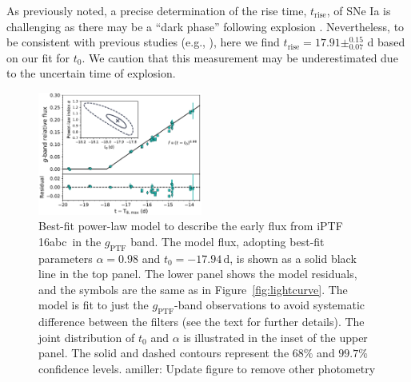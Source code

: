 \documentclass[twocolumn]{aastex61}
\newcommand{\abc}{iPTF\,16abc}
\newcommand{\amiller}[1]{{\color{blue} amiller: {#1}}}
\begin{document}
As previously noted, a precise determination of the rise time, $t_\mathrm{rise}$, of SNe Ia is challenging as there may be a ``dark phase'' following explosion \citep{2014ApJ...784...85P}. Nevertheless, to be consistent with previous studies (e.g., \citealt{2011MNRAS.416.2607G}), here we find $t_\mathrm{rise} = 17.91\pm _{0.07}^{0.15}$ d based on our fit for $t_0$. We caution that this measurement may be underestimated due to the uncertain time of explosion. 

\begin{figure}[!htb]
  \centering
  \includegraphics[width=0.48\textwidth]{early_lc.pdf}
  \caption{Best-fit power-law model to describe the early flux from 
  \abc\ in the $g_\mathrm{PTF}$ band. The model flux, adopting 
  best-fit parameters $\alpha=0.98$ and $t_0=-17.94\,\textrm{d}$, 
  is shown as a solid black line in the top panel. The lower panel 
  shows the model residuals, and the symbols are the same as in
  Figure~\ref{fig:lightcurve}. The model is fit to just the 
  $g_\mathrm{PTF}$-band observations to avoid systematic difference 
  between the filters (see the text for further 
  details). The joint distribution of $t_0$ and $\alpha$ is 
  illustrated in the inset of the upper panel. The solid and 
  dashed contours represent the $68\%$ and $99.7\%$ confidence 
  levels. \amiller{Update figure to remove other photometry}
  }
  \label{fig:early_lc_fit}
\end{figure}
\end{document}
